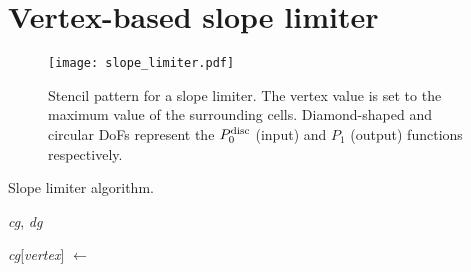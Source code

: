 \documentclass[thesis]{subfiles}
\begin{document}







\section{Vertex-based slope limiter}

\begin{figure}
  \centering
  \texttt{[image: slope\_limiter.pdf]}
  \caption{
    Stencil pattern for a slope limiter.
    The vertex value is set to the maximum value of the surrounding cells.
    Diamond-shaped and circular DoFs represent the $P_0^\textnormal{disc}$ (input) and $P_1$ (output) functions respectively.
  }
  \label{fig:slope_limiter_stencil}
\end{figure}

\begin{algorithm}
  \caption{
    Slope limiter algorithm.
  }
  \begin{algorithmic}[1]
    \Require \textit{cg}, \textit{dg} 

       
        \State \textit{cg}[\textit{vertex}] $\gets$ 
      \EndFor
    \EndFor
  \end{algorithmic}
  \label{alg:slope_limiter}
\end{algorithm}
\end{document}
